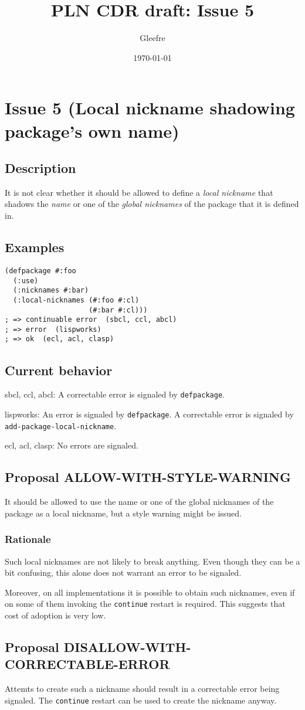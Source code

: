\documentclass[11pt]{article}
\author{Gleefre}
\date{\today}
\title{PLN CDR draft: Issue 5}
\begin{document}
\maketitle

\section{Issue 5 (Local nickname shadowing package's own name)}
\label{sec:orgbaf034a}
\subsection{Description}
\label{sec:org6951022}
It is not clear whether it should be allowed to define a \emph{local nickname} that
shadows the \emph{name} or one of the \emph{global nicknames} of the package that it is
defined in.
\subsection{Examples}
\label{sec:org0fe8511}
\begin{verbatim}
(defpackage #:foo
  (:use)
  (:nicknames #:bar)
  (:local-nicknames (#:foo #:cl)
                    (#:bar #:cl)))
; => continuable error  (sbcl, ccl, abcl)
; => error  (lispworks)
; => ok  (ecl, acl, clasp)
\end{verbatim}
\subsection{Current behavior}
\label{sec:org183c84d}
sbcl, ccl, abcl:
  A correctable error is signaled by \texttt{defpackage}.

lispworks:
  An error is signaled by \texttt{defpackage}.
  A correctable error is signaled by \texttt{add-package-local-nickname}.

ecl, acl, clasp:
  No errors are signaled.
\subsection{Proposal ALLOW-WITH-STYLE-WARNING}
\label{sec:org4f39b7f}
It should be allowed to use the name or one of the global nicknames of the package
as a local nickname, but a style warning might be issued.
\subsubsection{Rationale}
\label{sec:org8d6fdde}
Such local nicknames are not likely to break anything. Even though they can be a
bit confusing, this alone does not warrant an error to be signaled.

Moreover, on all implementations it is possible to obtain such nicknames, even if
on some of them invoking the \texttt{continue} restart is required. This suggests that
cost of adoption is very low.
\subsection{Proposal DISALLOW-WITH-CORRECTABLE-ERROR}
\label{sec:orgf11d312}
Attemts to create such a nickname should result in a correctable error being
signaled. The \texttt{continue} restart can be used to create the nickname anyway.
\end{document}
